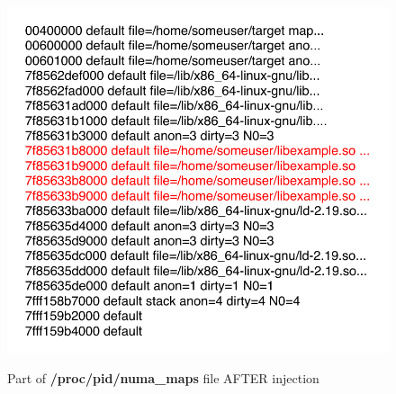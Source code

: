\documentclass[conference]{IEEEtran}
\newcommand{\marcos}[1]{{\color{green}{MARCOS: #1}}}
\begin{document}
\begin{figure}[htb!]
\footnotesize
\caption{Part of \textbf{/proc/pid/numa\_maps} file AFTER injection }
\includegraphics[center,scale=0.60]{apos-injecao.pdf}
\centering
\label{fig:apos-injecao}
\end{figure}

%
\end{document}
